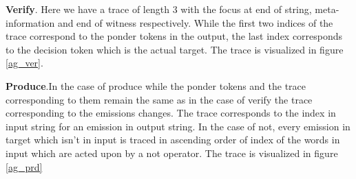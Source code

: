 \textbf{Verify}. Here we have a trace of length 3 with the focus at end of string, meta-information and end of witness respectively. While the first two indices of the trace correspond to the ponder tokens in the output, the last index corresponds to the decision token which is the actual target. The trace is visualized in figure \ref{ag_ver}.

\textbf{Produce}.In the case of produce while the ponder tokens and the trace corresponding to them remain the same as in the case of verify the trace corresponding to the emissions changes. The trace corresponds to the index in input string for an emission in output string. In the case of not, every emission in target which isn't in input is traced in ascending order of index of the words in input which are acted upon by a not operator. The trace is visualized in figure \ref{ag_prd}

